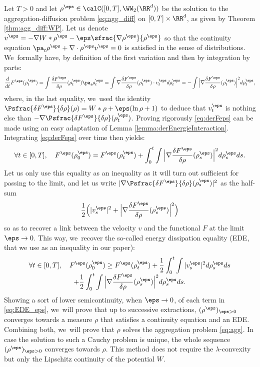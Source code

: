 Let $T>0$ and let $\rho^\eps \in \calC([0,T], \WW_2(\RR^d))$ be the solution to the aggregation-diffusion problem \eqref{eq:agg_diff} on $[0,T] \times \RR^d$, as given by Theorem \ref{thm:agg_diff:WP}. Let us denote $v^\eps = - \nabla W * \rho^\eps - \eps \sfrac{\nabla \rho^\eps}{\rho^\eps}$ so that the continuity equation $\pa_t \rho^\eps + \nabla \cdot \rho^\eps v^\eps = 0$ is satisfied in the sense of distributions. We~formally have, by definition of the first variation and then by integration by parts:
\begin{equation}\label{eq:derFeps}
\frac{d}{dt} F^\eps(\rho_t^\eps) = \int \frac{\delta F^\eps}{\delta \rho}(\rho_t^\eps) \pa_t \rho_t^\eps = \int \nabla \frac{\delta F^\eps}{\delta \rho}(\rho_t^\eps) \cdot v_t^\eps d\rho_t^\eps = - \int \Big| \nabla \frac{\delta F^\eps}{\delta \rho}(\rho_t^\eps) \Big|^2 d\rho_t^\eps,
\end{equation}
where, in the last equality, we~used the identity $\Psfrac{\delta F^\eps}{\delta \rho}(\rho) = W * \rho + \eps (\ln \rho +1)$ to deduce that $v_t^\eps$ is nothing else than $-\nabla \Psfrac{\delta F^\eps}{\delta \rho}(\rho_t^\eps)$. Proving rigorously \eqref{eq:derFeps} can be made using an easy adaptation of Lemma \ref{lemma:derEnergieInteraction}. Integrating \eqref{eq:derFeps} over time then yields:
\[
\forall t \in [0,T], \quad F^\eps(\rho^\eps_0) = F^\eps(\rho^\eps_t) + \int_0^t \int \Big| \nabla \frac{\delta F^\eps}{\delta \rho}(\rho_s^\eps) \Big|^2 d\rho_s^\eps ds.
\]
Let us only use this equality as an inequality as it will turn out sufficient for passing to the limit, and let us write $| \nabla \Psfrac{\delta F^\eps}{\delta \rho}(\rho_s^\eps) |^2$ as the half-sum
\[
\frac 12 \Bigl(|v^\eps_s|^2 + \Big| \nabla \frac{\delta F^\eps}{\delta \rho}(\rho_s^\eps) \Big|^2 \Bigr)
\]
so as to recover a link between the velocity $v$ and the functional $F$ at the limit $\eps \to 0$. This way, we~recover the so-called energy dissipation equality (EDE, that we use as an inequality in our paper):
\begin{multline}\label{eq:EDE_eps}
\forall t \in [0,T], \quad F^\eps(\rho^\eps_0) \geq F^\eps(\rho^\eps_t) + \frac 12 \int_0^t \int |v^\eps_s|^2 d\rho^\eps_s ds\\[-5pt]
+ \frac 12 \int_0^t \int \Big| \nabla \frac{\delta F^\eps}{\delta \rho}(\rho_s^\eps) \Big|^2 d\rho_s^\eps ds.
\end{multline}
Showing a sort of lower semicontinuity, when $\eps \to 0$, of each term in \eqref{eq:EDE_eps}, we~will prove that up to successive extractions, $(\rho^\eps)_{\eps>0}$ converges towards a measure $\rho$ that satisfies a continuity equation and an EDE. Combining both, we~will prove that $\rho$ solves the aggregation problem \eqref{eq:agg}. In case the solution to such a Cauchy problem is unique, the whole sequence $(\rho^\eps)_{\eps>0}$ converges towards $\rho$. This method does not require the $\lambda$-convexity but only the Lipschitz continuity of the potential $W$.
